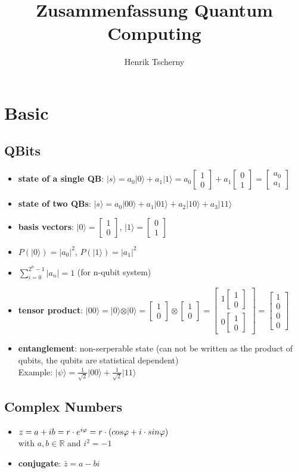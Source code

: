 \documentclass[12pt,a4paper]{article}
\title{Zusammenfassung Quantum Computing}
\author{Henrik Tscherny}
\newcommand{\ket}[1]{\vert #1 \rangle}
\newcommand*\vv[2]{
    \begin{bmatrix}#1\\#2\end{bmatrix}
}
\newcommand*\vvvv[4]{
    \begin{bmatrix}#1\\#2\\#3\\#4\end{bmatrix}
}
\begin{document}
\maketitle
\tableofcontents

\section{Basic}
\subsection{QBits}
\begin{itemize}
\item \textbf{state of a single QB}: $\ket{s} = a_0 \ket{0} + a_1 \ket{1} = a_0 \vv{1}{0} + a_1 \vv{0}{1} = \vv{a_0}{a_1}$
\item \textbf{state of two QBs}: $\ket{s} = a_0 \ket{00} + a_1 \ket{01} + a_2 \ket{10} + a_3 \ket{11}$
\item \textbf{basis vectors}: $\ket{0} = \vv{1}{0}$,  $\ket{1} = \vv{0}{1}$
\item $P(\ket{0}) = |a_0|^2$, $P(\ket{1}) = |a_1|^2$
\item $\displaystyle \sum_{i=0}^{2^n-1} |a_n| = 1$ (for n-qubit system)
\item \textbf{tensor product}: $\ket{00} = \ket{0} \otimes \ket{0} = \vv{1}{0} \otimes \vv{1}{0} = \vv{1\vv{1}{0}}{0\vv{1}{0}} = \vvvv{1}{0}{0}{0}$
\item \textbf{entanglement}: non-serperable state (can not be written as the product of qubits, the qubits are statistical dependent)\\
Example: $\ket{\psi} = \frac{1}{\sqrt{2}}\ket{00} + \frac{1}{\sqrt{2}}\ket{11}$
\end{itemize}

\subsection{Complex Numbers}
\begin{itemize}
\item $z = a + ib\\= r \cdot e^{i\varphi}\\= r\cdot (cos \varphi + i \cdot sin \varphi)$\\with $a,b \in \mathbb{R}$ and $i^2 = -1$
\item \textbf{conjugate}: $\bar{z}= a-bi$
\end{itemize}
\end{document}

